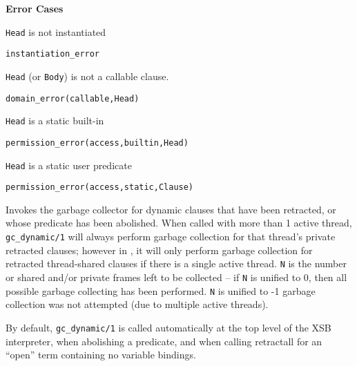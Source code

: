 \begin{description}
{\bf Error Cases}
\bi
\item 	{\tt Head} is not instantiated
\bi
\item 	{\tt instantiation\_error}
\ei
%
\item 	{\tt Head} (or {\tt Body}) is not a callable clause.
\bi
\item 	{\tt domain\_error(callable,Head)}
\ei
%
\item 	{\tt Head} is a static built-in
\bi
\item 	{\tt permission\_error(access,builtin,Head)}
\ei
\item 	{\tt Head} is a static user predicate
\bi
\item 	{\tt permission\_error(access,static,Clause)}
\ei
%
\ei

%
Invokes the garbage collector for dynamic clauses that have been
retracted, or whose predicate has been abolished.  When called with
more than 1 active thread, {\tt gc\_dynamic/1} will always perform
garbage collection for that thread's private retracted clauses;
however in \version{}, it will only perform garbage collection for
retracted thread-shared clauses if there is a single active thread.
{\tt N} is the number or shared and/or private frames left to be
collected -- if {\tt N} is unified to 0, then all possible garbage
collecting has been performed.  {\tt N} is unified to -1 garbage
collection was not attempted (due to multiple active threads).

By default, {\tt gc\_dynamic/1} is called automatically at the top
level of the XSB interpreter, when abolishing a predicate, and when
calling retractall for an ``open'' term containing no variable
bindings.

\end{description}
